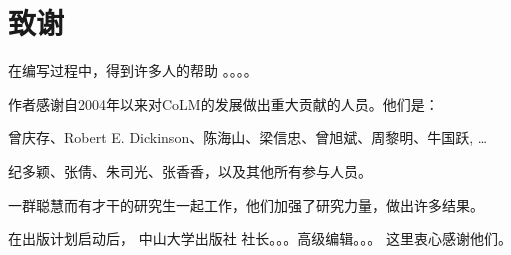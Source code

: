 \chapter*{致谢}

在编写过程中，得到许多人的帮助 。。。。

作者感谢自2004年以来对CoLM的发展做出重大贡献的人员。他们是：

曾庆存、Robert E. Dickinson、陈海山、梁信忠、曾旭斌、周黎明、牛国跃, …

纪多颖、张倩、朱司光、张香香，以及其他所有参与人员。

一群聪慧而有才干的研究生一起工作，他们加强了研究力量，做出许多结果。

在出版计划启动后， 中山大学出版社 社长。。。高级编辑。。。 这里衷心感谢他们。